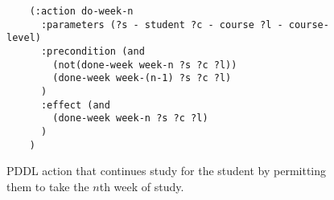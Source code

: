 \begin{figure}[t]
    \begin{lstlisting}
    (:action do-week-n
      :parameters (?s - student ?c - course ?l - course-level)
      :precondition (and 
        (not(done-week week-n ?s ?c ?l))
        (done-week week-(n-1) ?s ?c ?l)
      )
      :effect (and 
        (done-week week-n ?s ?c ?l)
      )
    )
    \end{lstlisting}
    \caption{PDDL action that continues study for the student by permitting them to take the $n$th week of study.}\label{fig:pddl-action-do-week-n}
\end{figure}
    
